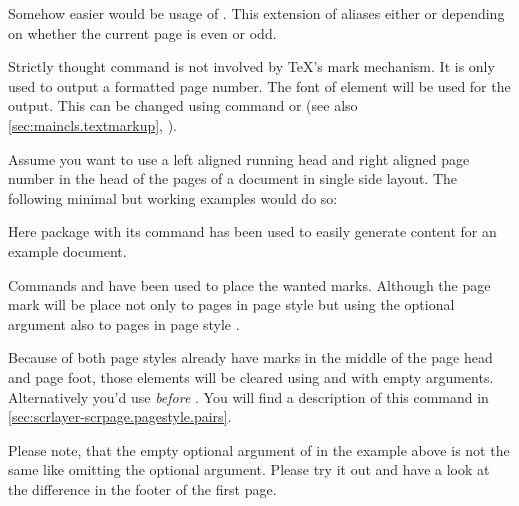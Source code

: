Somehow easier would be usage of . This extension of
 aliases either  or 
depending on whether the current page is even or odd.

Strictly thought command  is not involved by \TeX's mark
mechanism. It is only used to output a formatted page number.
%
The font of element
 will be used for
the output. This can be changed using command  or
 (see also \autoref{sec:maincls.textmarkup},
).%
%
%
\begin{Example}
  Assume you want to use a left aligned running head and right aligned page
  number in the head of the pages of a document in single side layout. The
  following minimal but working examples would do so:
  Here package  with its command
   has been used to easily
  generate content for an example document.

  Commands  and  have been used to place the wanted
  marks. Although the page mark will be place not only to pages in page style
   but using the optional argument also to pages in
  page style .

  Because of both page styles already have marks in the middle of the page
  head and page foot, those elements will be cleared using  and
   with empty arguments. Alternatively you'd use
   \emph{before} . You will find a
  description of this command in
  \autoref{sec:scrlayer-scrpage.pagestyle.pairs}.
\end{Example}

Please note, that the empty optional argument of
 in the example above is not the same like omitting the optional
argument. Please try it out and have a look at the difference in the footer of
the first page.%
%
%
%
%
%

